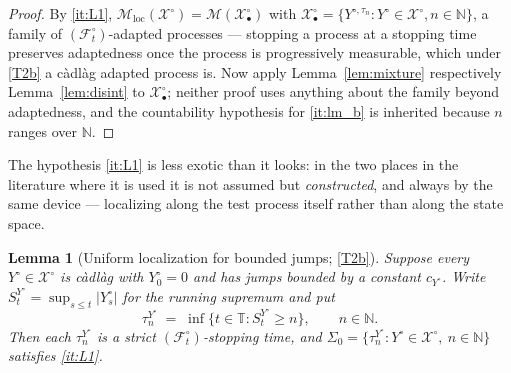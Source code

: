\documentclass[11pt,a4paper]{article}
\theoremstyle{plain}
\newtheorem{lemma}[theorem]{Lemma}
\theoremstyle{definition}
\theoremstyle{remark}
\newcommand{\N}{\mathbb{N}}
\newcommand{\T}{\mathbb{T}}                     %
\newcommand{\Filt}{\mathcal{F}}
\newcommand{\XX}{\mathcal{X}}                  %
\newcommand{\Msol}{\mathcal{M}}
\begin{document}
\begin{proof}
  By \ref{it:L1},
  $\Msol_{\mathrm{loc}}(\XX^\circ) = \Msol(\XX^\circ_\bullet)$ with
  $\XX^\circ_\bullet = \{Y^{\circ,\tau_n} : Y^\circ \in \XX^\circ, n \in \N\}$, a
  family of $(\Filt^\circ_t)$-adapted processes --- stopping a process at a
  stopping time preserves adaptedness once the process is progressively
  measurable, which under \eqref{T2b} a c\`adl\`ag adapted process is.  Now apply
  Lemma~\ref{lem:mixture} respectively Lemma~\ref{lem:disint} to
  $\XX^\circ_\bullet$; neither proof uses anything about the family beyond
  adaptedness, and the countability hypothesis for \ref{it:lm_b} is inherited
  because $n$ ranges over $\N$.
\end{proof}

The hypothesis \ref{it:L1} is less exotic than it looks: in the two places in the
literature where it is used it is not assumed but \emph{constructed}, and always
by the same device --- localizing along the test process itself rather than along
the state space.

\begin{lemma}[Uniform localization for bounded jumps; \eqref{T2b}]
  \label{lem:L1auto}
  Suppose every $Y^\circ \in \XX^\circ$ is c\`adl\`ag with $Y^\circ_0 = 0$ and has
  jumps bounded by a constant $c_{Y^\circ}$.  Write
  $S^{Y^\circ}_t = \sup_{s \leq t} |Y^\circ_s|$ for the running supremum and put
  \[
    \tau^{Y^\circ}_n \;=\; \inf\{ t \in \T : S^{Y^\circ}_t \geq n \} ,
    \qquad n \in \N .
  \]
  Then each $\tau^{Y^\circ}_n$ is a \emph{strict} $(\Filt^\circ_t)$-stopping
  time, and $\Sigma_0 = \{\tau^{Y^\circ}_n : Y^\circ \in \XX^\circ,\ n \in \N\}$
  satisfies \ref{it:L1}.
\end{lemma}
\end{document}
